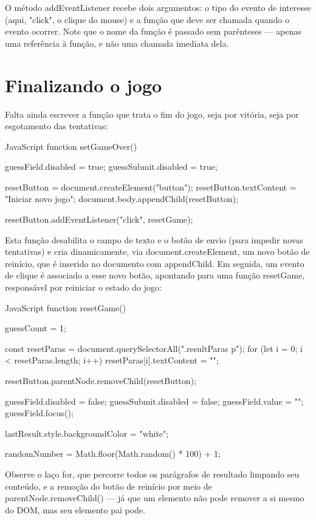 O método addEventListener recebe dois argumentos: o tipo do evento de interesse (aqui, "click", o clique do mouse) e a função que deve ser chamada quando o evento ocorrer. Note que o nome da função é passado sem parênteses — apenas uma referência à função, e não uma chamada imediata dela.

\section{Finalizando o jogo}

Falta ainda escrever a função que trata o fim do jogo, seja por vitória, seja por esgotamento das tentativas:

\begin{codebox}{JavaScript}
 function setGameOver() {
   guessField.disabled = true;
   guessSubmit.disabled = true;

     resetButton = document.createElement("button");
     resetButton.textContent = "Iniciar novo jogo";
     document.body.appendChild(resetButton);

     resetButton.addEventListener("click", resetGame);
 }
\end{codebox}

Esta função desabilita o campo de texto e o botão de envio (para impedir novas tentativas) e cria dinamicamente, via document.createElement, um novo botão de reinício, que é inserido no documento com appendChild. Em seguida, um evento de clique é associado a esse novo botão, apontando para uma função resetGame, responsável por reiniciar o estado do jogo:

\begin{codebox}{JavaScript}
 function resetGame() {
   guessCount = 1;

     const resetParas = document.querySelectorAll(".resultParas p");
     for (let i = 0; i < resetParas.length; i++) {
       resetParas[i].textContent = "";
     }

     resetButton.parentNode.removeChild(resetButton);

     guessField.disabled = false;
     guessSubmit.disabled = false;
     guessField.value = "";
     guessField.focus();

     lastResult.style.backgroundColor = "white";

     randomNumber = Math.floor(Math.random() * 100) + 1;
 }
\end{codebox}

Observe o laço for, que percorre todos os parágrafos de resultado limpando seu conteúdo, e a remoção do botão de reinício por meio de parentNode.removeChild() — já que um elemento não pode remover a si mesmo do DOM, mas seu elemento pai pode.

